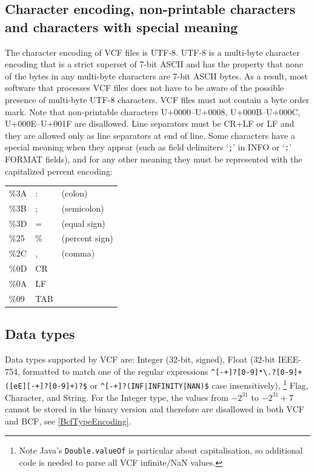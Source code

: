 \documentclass[8pt]{article}
\begin{document}
\subsection{Character encoding, non-printable characters and characters with special meaning}
\label{character-encoding}
The character encoding of VCF files is UTF-8.
UTF-8 is a multi-byte character encoding that is a strict superset of 7-bit ASCII and has the property that none of the bytes in any multi-byte characters are 7-bit ASCII bytes.
As a result, most software that processes VCF files does not have to be aware of the possible presence of multi-byte UTF-8 characters.
VCF files must not contain a byte order mark.
Note that non-printable characters U+0000--U+0008, U+000B--U+000C, U+000E--U+001F are disallowed.
Line separators must be CR+LF or LF and they are allowed only as line separators at end of line.
Some characters have a special meaning when they appear (such as field delimiters `\verb|;|' in INFO or `\verb|:|' FORMAT fields), and for any other meaning they must be represented with the capitalized percent encoding:

\begingroup\footnotesize
\begin{tabular}{l l l}
\%3A  &  :  & (colon)                \\
\%3B  &  ;  & (semicolon)            \\
\%3D  &  =  & (equal sign)           \\
\%25  &  \% & (percent sign)         \\
\%2C  &  ,  & (comma)                \\
\%0D  & CR  &                        \\
\%0A  & LF  &                        \\
\%09  & TAB & 
\end{tabular}
\endgroup


\subsection{Data types}
Data types supported by VCF are: Integer (32-bit, signed), Float (32-bit IEEE-754, formatted to match one of the regular expressions \verb|^[-+]?[0-9]*\.?[0-9]+([eE][-+]?[0-9]+)?$| or \verb"^[-+]?(INF|INFINITY|NAN)$" case insensitively),%
\footnote{Note Java's {\tt Double.valueOf} is particular about capitalisation, so additional code is needed to parse all VCF infinite/NaN values.}
Flag, Character, and String.
For the Integer type, the values from $-2^{31}$ to $-2^{31}+7$ cannot be stored in the binary version and therefore are disallowed in both VCF and BCF, see \ref{BcfTypeEncoding}.
\end{document}
